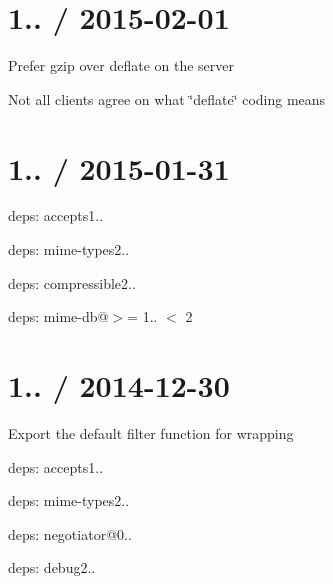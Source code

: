 \section*{1.. / 2015-\/02-\/01 }


\begin{DoxyItemize}
\item Prefer {\ttfamily gzip} over {\ttfamily deflate} on the server
\begin{DoxyItemize}
\item Not all clients agree on what \char`\"{}deflate\char`\"{} coding means
\end{DoxyItemize}
\end{DoxyItemize}

\section*{1.. / 2015-\/01-\/31 }


\begin{DoxyItemize}
\item deps\+: accepts1..
\begin{DoxyItemize}
\item deps\+: mime-\/types2..
\end{DoxyItemize}
\item deps\+: compressible2..
\begin{DoxyItemize}
\item deps\+: mime-\/db@\textquotesingle{}$>$= 1.. $<$ 2\textquotesingle{}
\end{DoxyItemize}
\end{DoxyItemize}

\section*{1.. / 2014-\/12-\/30 }


\begin{DoxyItemize}
\item Export the default {\ttfamily filter} function for wrapping
\item deps\+: accepts1..
\begin{DoxyItemize}
\item deps\+: mime-\/types2..
\item deps\+: negotiator@0..
\end{DoxyItemize}
\item deps\+: debug2..
\end{DoxyItemize}


